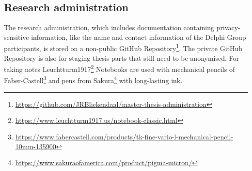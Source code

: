 \subsection{Research administration}
\label{tbresearchadministration}
The research administration, which includes documentation containing privacy-sensitive information, like the name and contact information of the Delphi Group participants, is stored on a non-public GitHub Repository\footnote{\url{https://github.com/JRBliekendaal/master-thesis-administration}}. The private GitHub Repository is also for staging thesis parts that still need to be anonymised. For taking notes Leuchtturm1917\footnote{\url{https://www.leuchtturm1917.us/notebook-classic.html}} Notebooks are used with mechanical pencils of Faber-Castell\footnote{\url{https://www.fabercastell.com/products/tk-fine-vario-l-mechanical-pencil-10mm-135900}} and pens from Sakura\footnote{\url{https://www.sakuraofamerica.com/product/pigma-micron/}} with long-lasting ink.
